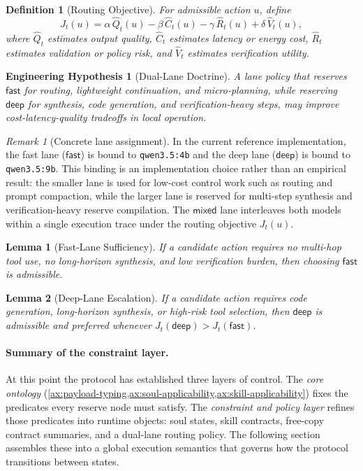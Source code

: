 \documentclass[11pt]{article}
\newtheorem{definition}{Definition}[section]
\newtheorem{lemma}{Lemma}[section]
\newtheorem{hypothesis}{Engineering Hypothesis}[section]
\theoremstyle{remark}
\newtheorem{remark}{Remark}[section]
\newcommand{\fast}{\mathsf{fast}}
\newcommand{\deep}{\mathsf{deep}}
\newcommand{\mixed}{\mathsf{mixed}}
\begin{document}
\begin{definition}[Routing Objective]
For admissible action \(u\), define
\[
J_t(u)=\alpha\,\widehat{Q}_t(u)-\beta\,\widehat{C}_t(u)-\gamma\,\widehat{R}_t(u)+\delta\,\widehat{V}_t(u),
\]
where \(\widehat{Q}_t\) estimates output quality, \(\widehat{C}_t\) estimates latency or energy cost, \(\widehat{R}_t\) estimates validation or policy risk, and \(\widehat{V}_t\) estimates verification utility.
\end{definition}

\begin{hypothesis}[Dual-Lane Doctrine]
A lane policy that reserves \(\fast\) for routing, lightweight continuation, and micro-planning, while reserving \(\deep\) for synthesis, code generation, and verification-heavy steps, may improve cost-latency-quality tradeoffs in local operation.
\end{hypothesis}

\begin{remark}[Concrete lane assignment]\label{rem:lane-assignment}
In the current reference implementation, the fast lane ($\fast$) is bound to \texttt{qwen3.5:4b} and the deep lane ($\deep$) is bound to \texttt{qwen3.5:9b}. This binding is an implementation choice rather than an empirical result: the smaller lane is used for low-cost control work such as routing and prompt compaction, while the larger lane is reserved for multi-step synthesis and verification-heavy reserve compilation. The $\mixed$ lane interleaves both models within a single execution trace under the routing objective \(J_t(u)\).
\end{remark}

\begin{lemma}[Fast-Lane Sufficiency]
If a candidate action requires no multi-hop tool use, no long-horizon synthesis, and low verification burden, then choosing \(\fast\) is admissible.
\end{lemma}

\begin{lemma}[Deep-Lane Escalation]
If a candidate action requires code generation, long-horizon synthesis, or high-risk tool selection, then \(\deep\) is admissible and preferred whenever \(J_t(\deep)>J_t(\fast)\).
\end{lemma}

\paragraph{Summary of the constraint layer.}
At this point the protocol has established three layers of control.
The \emph{core ontology} (\cref{ax:payload-typing,ax:soul-applicability,ax:skill-applicability}) fixes the predicates every reserve node must satisfy.
The \emph{constraint and policy layer} refines those predicates into runtime objects: soul states, skill contracts, free-copy contract summaries, and a dual-lane routing policy.
The following section assembles these into a global execution semantics that governs how the protocol transitions between states.
\end{document}
